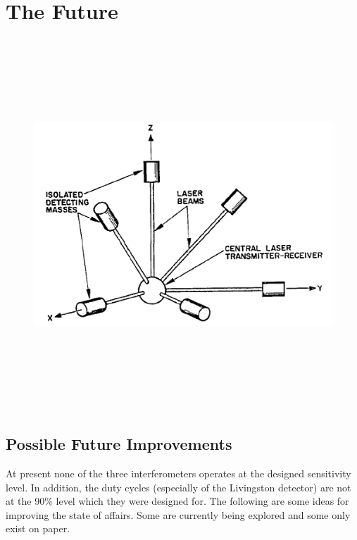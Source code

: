 \chapter{The Future}
\label{chap:future}

\begin{figure}[!h]
\centerline{\includegraphics[angle=0,height=5.5in]{Figures/Chap8/Porcupine.png}}
\end{figure}
\clearpage



\section{Possible Future Improvements}

At present none of the three interferometers operates at the designed sensitivity
level. In addition, the duty cycles (especially of the Livingston detector) are
not at the 90\% level which they were designed for. The following are some ideas
for improving the state of affairs. Some are currently being explored and some only
exist on paper.


